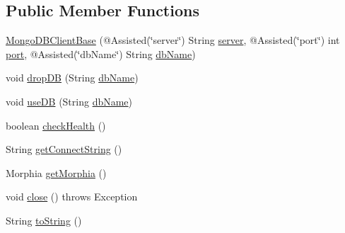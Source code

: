 \subsection*{Public Member Functions}
\begin{DoxyCompactItemize}
\item 
\hyperlink{classedu_1_1sjsu_1_1amigo_1_1db_1_1common_1_1mongodb_1_1_mongo_d_b_client_base_a2f238f9220270db8d0b0cb90be2028bd}{Mongo\+D\+B\+Client\+Base} (@Assisted(\char`\"{}server\char`\"{}) String \hyperlink{classedu_1_1sjsu_1_1amigo_1_1db_1_1common_1_1mongodb_1_1_mongo_d_b_client_base_acc3f5ff73b7e3ffe9af475a23c208119}{server}, @Assisted(\char`\"{}port\char`\"{}) int \hyperlink{classedu_1_1sjsu_1_1amigo_1_1db_1_1common_1_1mongodb_1_1_mongo_d_b_client_base_ae4ea19c2e926899224780fd86e6f2e64}{port}, @Assisted(\char`\"{}db\+Name\char`\"{}) String \hyperlink{classedu_1_1sjsu_1_1amigo_1_1db_1_1common_1_1mongodb_1_1_mongo_d_b_client_base_a53368e64a0b78deaf8577c6fa9010cdb}{db\+Name})
\item 
void \hyperlink{classedu_1_1sjsu_1_1amigo_1_1db_1_1common_1_1mongodb_1_1_mongo_d_b_client_base_a1958dd7d55b132f55c54547e70ddb52f}{drop\+DB} (String \hyperlink{classedu_1_1sjsu_1_1amigo_1_1db_1_1common_1_1mongodb_1_1_mongo_d_b_client_base_a53368e64a0b78deaf8577c6fa9010cdb}{db\+Name})
\item 
void \hyperlink{classedu_1_1sjsu_1_1amigo_1_1db_1_1common_1_1mongodb_1_1_mongo_d_b_client_base_ae5ba446aa4f03a5846f3c9e59ff10cca}{use\+DB} (String \hyperlink{classedu_1_1sjsu_1_1amigo_1_1db_1_1common_1_1mongodb_1_1_mongo_d_b_client_base_a53368e64a0b78deaf8577c6fa9010cdb}{db\+Name})
\item 
boolean \hyperlink{classedu_1_1sjsu_1_1amigo_1_1db_1_1common_1_1mongodb_1_1_mongo_d_b_client_base_aad703e503bf7486a5ac2f2838ef49108}{check\+Health} ()
\item 
String \hyperlink{classedu_1_1sjsu_1_1amigo_1_1db_1_1common_1_1mongodb_1_1_mongo_d_b_client_base_af5de39557a28690a32d078484a8938f7}{get\+Connect\+String} ()
\item 
Morphia \hyperlink{classedu_1_1sjsu_1_1amigo_1_1db_1_1common_1_1mongodb_1_1_mongo_d_b_client_base_ab0c99c600064e004c29f459b7dc86650}{get\+Morphia} ()
\item 
void \hyperlink{classedu_1_1sjsu_1_1amigo_1_1db_1_1common_1_1mongodb_1_1_mongo_d_b_client_base_a2d1bef646bf6bcc0e61cad0861c8a1ef}{close} ()  throws Exception 
\item 
String \hyperlink{classedu_1_1sjsu_1_1amigo_1_1db_1_1common_1_1mongodb_1_1_mongo_d_b_client_base_a8b92d5bc61c9813cbbabfa4b2ce5521e}{to\+String} ()
\end{DoxyCompactItemize}
